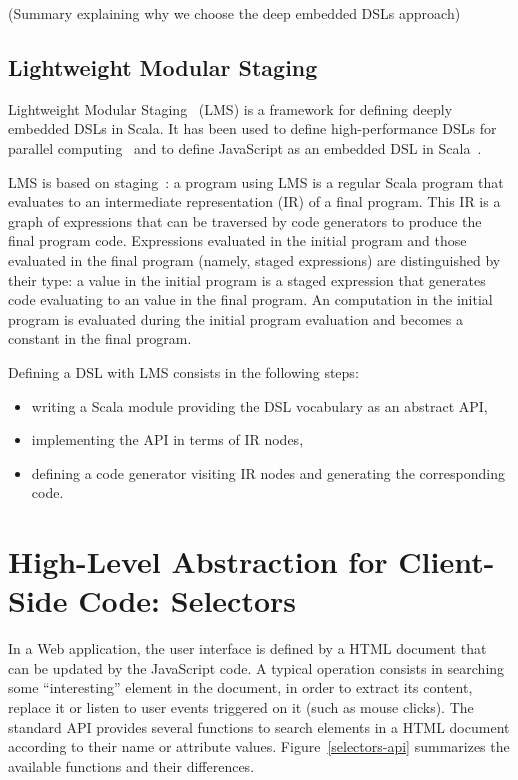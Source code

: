 \documentclass[preprint]{sigplanconf}
\begin{document}
(Summary explaining why we choose the deep embedded DSLs approach)

\subsection{Lightweight Modular Staging}

Lightweight Modular Staging~\cite{Rompf12_LMSThesis, Rompf12_LMS} (LMS) is a framework for defining
deeply embedded DSLs in Scala. It has been used to define high-performance DSLs for parallel
computing~\cite{Brown11_Parallel} and to define JavaScript as an embedded DSL in
Scala~\cite{Kossakowski12_JsDESL}.

LMS is based on staging~\cite{Jorring1986_Staging}: a program using LMS is a regular Scala program
that evaluates to an intermediate representation (IR) of a final program. This IR is a graph of
expressions that can be traversed by code generators to produce the final program code. Expressions
evaluated in the initial program and those evaluated in the final program (namely, staged
expressions) are distinguished by their type: a  value in the initial program is a
staged expression that generates code evaluating to an  value in the final program. An
 computation in the initial program is evaluated during the initial program evaluation and
becomes a constant in the final program.

Defining a DSL with LMS consists in the following steps:

\begin{itemize}
 \item writing a Scala module providing the DSL vocabulary as an abstract API,
 \item implementing the API in terms of IR nodes,
 \item defining a code generator visiting IR nodes and generating the corresponding code.
\end{itemize}

\section{High-Level Abstraction for Client-Side Code: Selectors}
\label{contribution}

In a Web application, the user interface is defined by a HTML document that can be updated by the
JavaScript code. A typical operation consists in searching some “interesting” element in the
document, in order to extract its content, replace it or listen to user events triggered on it (such
as mouse clicks). The standard API provides several functions to search elements in a HTML document
according to their name or attribute values. Figure~\ref{selectors-api} summarizes the available
functions and their differences.
\end{document}
